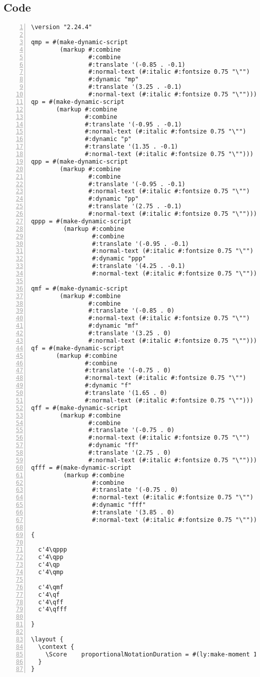 \subsection{Code}
\begin{Verbatim}[numbers=left,xleftmargin=5mm]
\version "2.24.4"

qmp = #(make-dynamic-script
        (markup #:combine
                #:combine
                #:translate '(-0.85 . -0.1)
                #:normal-text (#:italic #:fontsize 0.75 "\"")
                #:dynamic "mp"
                #:translate '(3.25 . -0.1)
                #:normal-text (#:italic #:fontsize 0.75 "\"")))
qp = #(make-dynamic-script
       (markup #:combine
               #:combine
               #:translate '(-0.95 . -0.1)
               #:normal-text (#:italic #:fontsize 0.75 "\"")
               #:dynamic "p"
               #:translate '(1.35 . -0.1)
               #:normal-text (#:italic #:fontsize 0.75 "\"")))
qpp = #(make-dynamic-script
        (markup #:combine
                #:combine
                #:translate '(-0.95 . -0.1)
                #:normal-text (#:italic #:fontsize 0.75 "\"")
                #:dynamic "pp"
                #:translate '(2.75 . -0.1)
                #:normal-text (#:italic #:fontsize 0.75 "\"")))
qppp = #(make-dynamic-script
         (markup #:combine
                 #:combine
                 #:translate '(-0.95 . -0.1)
                 #:normal-text (#:italic #:fontsize 0.75 "\"")
                 #:dynamic "ppp"
                 #:translate '(4.25 . -0.1)
                 #:normal-text (#:italic #:fontsize 0.75 "\"")))

qmf = #(make-dynamic-script
        (markup #:combine
                #:combine
                #:translate '(-0.85 . 0)
                #:normal-text (#:italic #:fontsize 0.75 "\"")
                #:dynamic "mf"
                #:translate '(3.25 . 0)
                #:normal-text (#:italic #:fontsize 0.75 "\"")))
qf = #(make-dynamic-script
       (markup #:combine
               #:combine
               #:translate '(-0.75 . 0)
               #:normal-text (#:italic #:fontsize 0.75 "\"")
               #:dynamic "f"
               #:translate '(1.65 . 0)
               #:normal-text (#:italic #:fontsize 0.75 "\"")))
qff = #(make-dynamic-script
        (markup #:combine
                #:combine
                #:translate '(-0.75 . 0)
                #:normal-text (#:italic #:fontsize 0.75 "\"")
                #:dynamic "ff"
                #:translate '(2.75 . 0)
                #:normal-text (#:italic #:fontsize 0.75 "\"")))
qfff = #(make-dynamic-script
         (markup #:combine
                 #:combine
                 #:translate '(-0.75 . 0)
                 #:normal-text (#:italic #:fontsize 0.75 "\"")
                 #:dynamic "fff"
                 #:translate '(3.85 . 0)
                 #:normal-text (#:italic #:fontsize 0.75 "\"")))

{

  c'4\qppp
  c'4\qpp
  c'4\qp
  c'4\qmp

  c'4\qmf
  c'4\qf
  c'4\qff
  c'4\qfff

}

\layout {
  \context {
    \Score    proportionalNotationDuration = #(ly:make-moment 1/9)
  }
}
\end{Verbatim}
